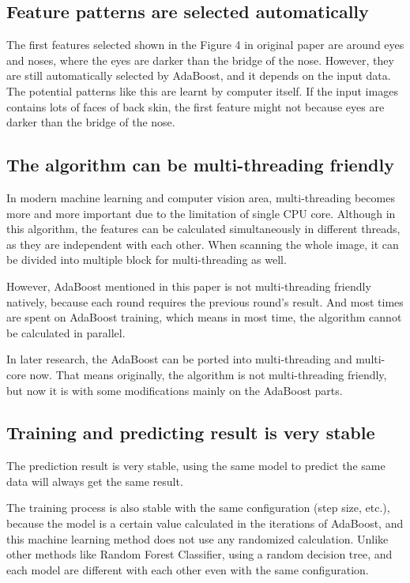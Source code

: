 \documentclass[10pt,twocolumn,letterpaper]{article}
\begin{document}
\subsection{Feature patterns are selected automatically}
The first features selected shown in the Figure 4 in original paper are around eyes and noses, where the eyes are darker than the bridge of the nose.
However, they are still automatically selected by AdaBoost, and it depends on the input data. The potential patterns like this are learnt by computer itself.
If the input images contains lots of faces of back skin, the first feature might not because eyes are darker than the bridge of the nose.

\subsection{The algorithm can be multi-threading friendly}
In modern machine learning and computer vision area, multi-threading becomes more and more important due to the limitation of single CPU core.
Although in this algorithm, the features can be calculated simultaneously in different threads, as they are independent with each other.
When scanning the whole image, it can be divided into multiple block for multi-threading as well.

However, AdaBoost mentioned in this paper is not multi-threading friendly natively, because each round requires the previous round's result.
And most times are spent on AdaBoost training, which means in most time, the algorithm cannot be calculated in parallel.

In later research, the AdaBoost can be ported into multi-threading and multi-core \cite{mt} now.
That means originally, the algorithm is not multi-threading friendly, but now it is with some modifications mainly on the AdaBoost parts.

\subsection{Training and predicting result is very stable}
The prediction result is very stable, using the same model to predict the same data will always get the same result.

The training process is also stable with the same configuration (step size, etc.),
because the model is a certain value calculated in the iterations of AdaBoost,
and this machine learning method does not use any randomized calculation.
Unlike other methods like Random Forest Classifier, using a random decision tree,
and each model are different with each other even with the same configuration.
\end{document}
